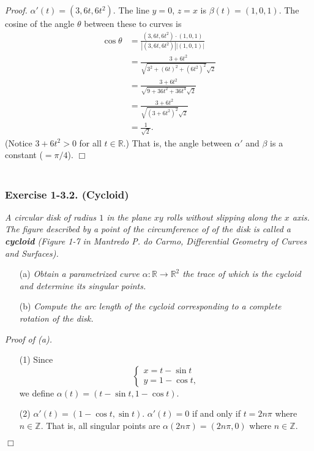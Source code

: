 \documentclass{article}
\begin{document}
\emph{Proof.}
$\alpha'(t) = (3, 6t, 6t^2)$.
The line $y = 0$, $z = x$ is $\beta(t) = (1,0,1)$.
The cosine of the angle $\theta$ between these to curves is
\begin{align*}
  \cos \theta
  &= \frac{(3, 6t, 6t^2) \cdot (1,0,1)}{|(3, 6t, 6t^2)||(1,0,1)|} \\
  &= \frac{3+6t^2}{\sqrt{3^2 + (6t)^2 + (6t^2)^2}\sqrt{2}} \\
  &= \frac{3+6t^2}{\sqrt{9 + 36 t^2 + 36t^4}\sqrt{2}} \\
  &= \frac{3+6t^2}{\sqrt{(3 + 6t^2)^2}\sqrt{2}} \\
  &= \frac{1}{\sqrt{2}}.
\end{align*}
(Notice $3 + 6t^2 > 0$ for all $t \in \mathbb{R}$.)
That is, the angle between $\alpha'$ and $\beta$ is a constant ($= \pi/4$).
$\Box$ \\\\






\subsubsection*{Exercise 1-3.2. (Cycloid)}
\emph{A circular disk of radius $1$ in the plane $xy$ rolls without slipping
along the $x$ axis.
The figure described by a point of the circumference of of the disk is
called a \textbf{cycloid}
(Figure 1-7 in Mantredo P. do Carmo, Differential Geometry of Curves and Surfaces).}
\begin{enumerate}
\item[(a)]
  \emph{Obtain a parametrized curve $\alpha: \mathbb{R} \to \mathbb{R}^2$
  the trace of which is the cycloid and determine its singular points.}

\item[(b)]
  \emph{Compute the arc length of the cycloid
  corresponding to a complete rotation of the disk.} \\
\end{enumerate}



\emph{Proof of (a).}
\begin{enumerate}
\item[(1)]
Since
\begin{equation*}
  \begin{cases}
     x = t - \sin t \\
     y = 1 - \cos t,
  \end{cases}
\end{equation*}
we define $\alpha(t) = (t - \sin t, 1 - \cos t)$.
\item[(2)]
$\alpha'(t) = (1 - \cos t, \sin t)$.
$\alpha'(t) = 0$ if and only if $t = 2n\pi$ where $n \in \mathbb{Z}$.
That is, all singular points are $\alpha(2n\pi) = (2n\pi, 0)$ where $n \in \mathbb{Z}$.
\end{enumerate}
$\Box$ \\
\end{document}
